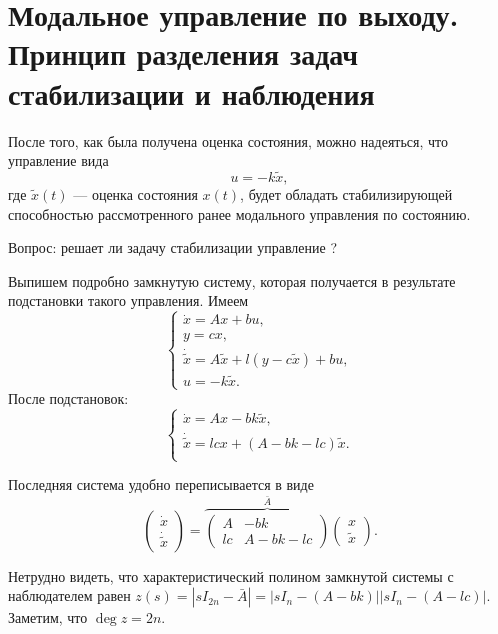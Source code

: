 \documentclass[../../TAU.tex]{subfiles}
\begin{document}
\section{Модальное управление по выходу. Принцип разделения задач стабилизации и наблюдения}

    После того, как была получена оценка состояния, можно надеяться, что управление вида
    \begin{equation}\label{CONTR}
        u = -k \tilde x,
    \end{equation}
    где $\tilde x (t)$ --- оценка состояния $x(t)$, будет обладать стабилизирующей способностью рассмотренного ранее модального управления по состоянию.

    Вопрос: решает ли задачу стабилизации управление ?

    Выпишем подробно замкнутую систему, которая получается в результате подстановки такого управления. Имеем
    $$
        \left\{
        \begin{aligned}
        \dot x = Ax+bu,\\
        y=cx,\\
        \dot{\tilde x} = A\tilde x + l(y-c\tilde x) + bu,\\
        u = -k\tilde x.
        \end{aligned}
        \right.
    $$
    После подстановок:
    $$
        \left\{
        \begin{aligned}
        \dot x = Ax-bk\tilde x,\\
        \dot{\tilde x} = lc x + (A- bk-lc)\tilde x .\\
        \end{aligned}
        \right.
    $$

    Последняя система удобно переписывается в виде
    $$
        \begin{pmatrix}
        \dot x\\
        \dot{\tilde x}
        \end{pmatrix}
        =
        \overbrace{\begin{pmatrix}
        A & -bk\\
        lc& A-bk-lc
        \end{pmatrix}}^{ \bar A}
        \begin{pmatrix}
        x\\
        \tilde x
        \end{pmatrix}.
    $$

    Нетрудно видеть, что характеристический полином замкнутой системы с наблюдателем равен $z(s) = |sI_{2n} - \bar A | = |sI_n - (A-bk)||sI_n-(A-lc)|$. Заметим, что $\deg z = 2n$.
\end{document}

